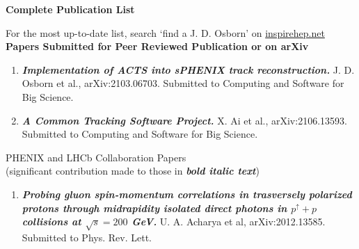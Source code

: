 \documentclass[11pt]{article}
\begin{document}
%
%
%

\newpage




\cleardoublepage

\begin{flushleft}

\huge\textbf{Complete Publication List}
\vspace{0.5cm}

{\large For the most up-to-date list, search `find a J. D. Osborn' on \href{inspirehep.net}{inspirehep.net} \\}
\vspace{0.5cm}
\Large\textbf{Papers Submitted for Peer Reviewed Publication or on arXiv} \\
\normalsize
\begin{center}
	\begin{flushleft}
	
	\begin{enumerate}
		
		
		\item {\textbf{\textit{Implementation of ACTS into sPHENIX track reconstruction.}}} J. D. Osborn et al., arXiv:2103.06703. Submitted to Computing and Software for Big Science.
		\item {\textbf{\textit{A Common Tracking Software Project.}}} X. Ai et al., arXiv:2106.13593. Submitted to Computing and Software for Big Science.
	\end{enumerate}
	
	\vspace{0.7cm}
	\large PHENIX and LHCb Collaboration Papers\\ (significant contribution made to those in \textbf{\textit{bold italic text}}) \\
	\end{flushleft}
	\begin{enumerate}

	\item \textbf{\textit{Probing gluon spin-momentum correlations in trasversely polarized protons through midrapidity isolated direct photons in $p^\uparrow+p$ collisions at $\sqrt{s}=200$ GeV.}} U. A. Acharya et al, arXiv:2012.13585. Submitted to Phys. Rev. Lett.
			


\end{enumerate}
\end{center}
\end{flushleft}
\end{document}
